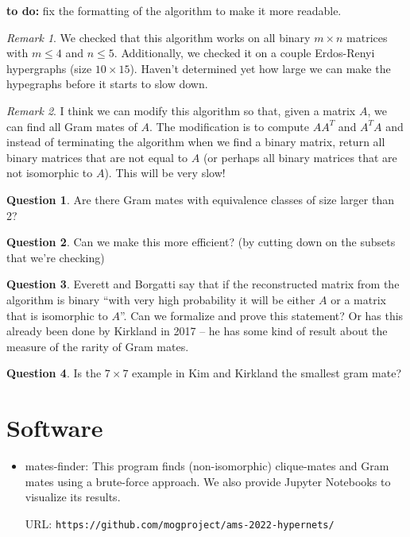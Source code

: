 \documentclass[11pt]{article}
\theoremstyle{definition}
\newtheorem{question}{Question}
\theoremstyle{remark}
\newtheorem{remark}{Remark}
\begin{document}
{\bf to do:} fix the formatting of the algorithm to make it more readable. 
	
\begin{remark}
We checked that this algorithm works on all binary $m \times n$ matrices with $m \leq 4$ and $n \leq 5$. Additionally, we checked it on a couple Erdos-Renyi hypergraphs (size $10 \times 15$). Haven't determined yet how large we can make the hypegraphs before it starts to slow down. 
\end{remark}
	
\begin{remark}
I think we can modify this algorithm so that, given a matrix $A$, we can find all Gram mates of $A$. The modification is to compute $AA^{T}$ and $A^{T}A$ and instead of terminating the algorithm when we find a binary matrix, return all binary matrices that are not equal to $A$ (or perhaps all binary matrices that are not isomorphic to $A$). This will be very slow!
\end{remark}

\begin{question}
Are there Gram mates with equivalence classes of size larger than 2?
\end{question}

\begin{question}
Can we make this more efficient? (by cutting down on the subsets that we're checking)
\end{question}

\begin{question}
Everett and Borgatti say that if the reconstructed matrix from the algorithm is binary ``with very high probability it will be either $A$ or a matrix that is isomorphic to $A$''. Can we formalize and prove this statement? Or has this already been done by Kirkland in 2017 -- he has some kind of result about the measure of the rarity of Gram mates. 
\end{question}

\begin{question}
Is the $7 \times 7$ example in Kim and Kirkland \cite{Kirkland} the smallest gram mate?
\end{question}



\section{Software}
\begin{itemize}
  \item \textsf{mates-finder}: This program finds (non-isomorphic) clique-mates and Gram mates using a brute-force approach.
  We also provide Jupyter Notebooks to visualize its results.

  URL: \texttt{https://github.com/mogproject/ams-2022-hypernets/}

\end{itemize}



\end{document}
